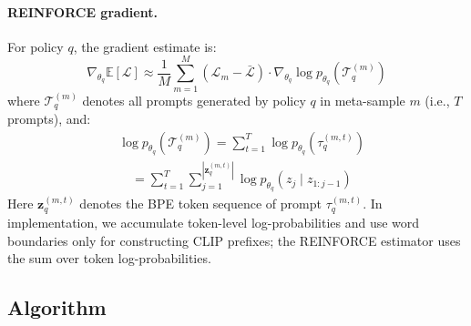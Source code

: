 \documentclass{article}
\begin{document}
\paragraph{REINFORCE gradient.} For policy $q$, the gradient estimate is:
\begin{equation}
    \nabla_{\theta_q} \mathbb{E}[\mathcal{L}] \approx \frac{1}{M} \sum_{m=1}^{M} \left( \mathcal{L}_m - \bar{\mathcal{L}} \right) \cdot \nabla_{\theta_q} \log p_{\theta_q}(\mathcal{T}_q^{(m)})
    \label{eq:reinforce_grad}
\end{equation}
where $\mathcal{T}_q^{(m)}$ denotes all prompts generated by policy $q$ in meta-sample $m$ (i.e., $T$ prompts), and:
\begin{align*}
    &\log p_{\theta_q}(\mathcal{T}_q^{(m)}) = \sum_{t=1}^{T} \log p_{\theta_q}(\tau_q^{(m,t)}) \\
    &\quad = \sum_{t=1}^{T} \sum_{j=1}^{|\mathbf{z}_q^{(m,t)}|} \log p_{\theta_q}(z_j \mid z_{1:j-1})
\end{align*}
Here $\mathbf{z}_q^{(m,t)}$ denotes the BPE token sequence of prompt $\tau_q^{(m,t)}$. In implementation, we accumulate token-level log-probabilities and use word boundaries only for constructing CLIP prefixes; the REINFORCE estimator uses the sum over token log-probabilities.

\subsection{Algorithm}
\label{sec:reinforce:algorithm}
\end{document}
